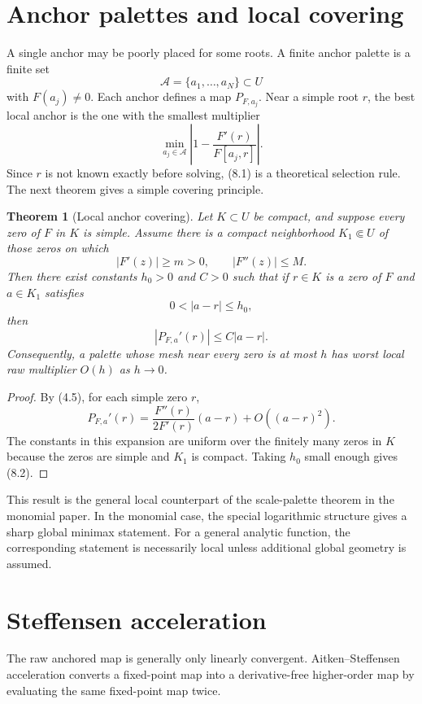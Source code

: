 \documentclass[11pt]{article}
\newtheorem{theorem}{Theorem}[section]
\theoremstyle{definition}
\begin{document}
\section{Anchor palettes and local covering}

A single anchor may be poorly placed for some roots.  A finite anchor palette is a finite set
\[
        \mathcal{A}=\{a_1,\ldots,a_N\}\subset U
\]
with $F(a_j)\ne0$.  Each anchor defines a map $P_{F,a_j}$.  Near a simple root $r$, the best local anchor is the one with the smallest multiplier
\[
        \min_{a_j\in\mathcal{A}}
        \left|1-\frac{F'(r)}{F[a_j,r]}\right|.
        \tag{8.1}
\]
Since $r$ is not known exactly before solving, (8.1) is a theoretical selection rule.  The next theorem gives a simple covering principle.

\begin{theorem}[Local anchor covering]
Let $K\subset U$ be compact, and suppose every zero of $F$ in $K$ is simple.  Assume there is a compact neighborhood $K_1\Subset U$ of those zeros on which
\[
        |F'(z)|\ge m>0,
        \qquad
        |F''(z)|\le M.
\]
Then there exist constants $h_0>0$ and $C>0$ such that if $r\in K$ is a zero of $F$ and $a\in K_1$ satisfies
\[
        0<|a-r|\le h_0,
\]
then
\[
        |P_{F,a}'(r)|\le C|a-r|.
        \tag{8.2}
\]
Consequently, a palette whose mesh near every zero is at most $h$ has worst local raw multiplier $O(h)$ as $h\to0$.
\end{theorem}

\begin{proof}
By (4.5), for each simple zero $r$,
\[
        P_{F,a}'(r)=\frac{F''(r)}{2F'(r)}(a-r)+O((a-r)^2).
\]
The constants in this expansion are uniform over the finitely many zeros in $K$ because the zeros are simple and $K_1$ is compact.  Taking $h_0$ small enough gives (8.2).
\end{proof}

This result is the general local counterpart of the scale-palette theorem in the monomial paper.  In the monomial case, the special logarithmic structure gives a sharp global minimax statement.  For a general analytic function, the corresponding statement is necessarily local unless additional global geometry is assumed.

\section{Steffensen acceleration}

The raw anchored map is generally only linearly convergent.  Aitken--Steffensen acceleration converts a fixed-point map into a derivative-free higher-order map by evaluating the same fixed-point map twice.
\end{document}
